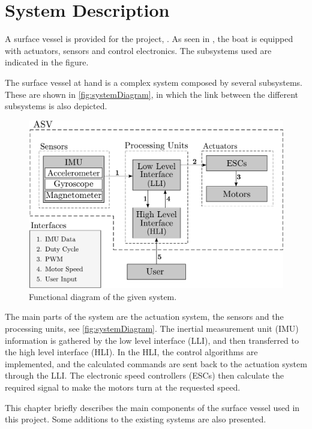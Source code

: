 \chapter{System Description}
A surface vessel is provided for the project, \cite{aauship}. As seen in , the boat is equipped with actuators, sensors and control electronics. The subsystems used are indicated in the figure.

The surface vessel at hand is a complex system composed by several subsystems. These are shown in \autoref{fig:systemDiagram}, in which the link between the different subsystems is also depicted.
%
\begin{figure}[H]
    \includegraphics[width=.65\textwidth]{figures/systemDiagram4}
    \caption{Functional diagram of the given system.}
    \label{fig:systemDiagram}
\end{figure}
%

The main parts of the system are the actuation system, the sensors and the processing units, see \autoref{fig:systemDiagram}. The inertial measurement unit (IMU) information is gathered by the low level interface (LLI), and then transferred to the high level interface (HLI). In the HLI, the control algorithms are implemented, and the calculated commands are sent back to the actuation system through the LLI. The electronic speed controllers (ESCs) then calculate the required signal to make the motors turn at the requested speed.

This chapter briefly describes the main components of the surface vessel used in this project. Some additions to the existing systems are also presented.

